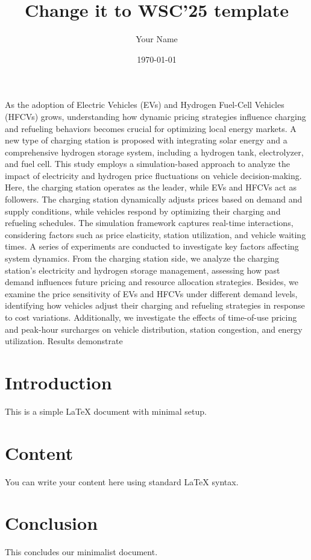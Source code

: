 \documentclass{article}
\begin{document}
\title{Change it to WSC'25 template}
\author{Your Name}
\date{\today}

\maketitle

As the adoption of Electric Vehicles (EVs) and Hydrogen Fuel-Cell Vehicles (HFCVs) grows, understanding how dynamic pricing strategies influence charging and refueling behaviors becomes crucial for optimizing local energy markets. A new type of charging station is proposed with integrating solar energy and a comprehensive hydrogen storage system, including a hydrogen tank, electrolyzer, and fuel cell. This study employs a simulation-based approach to analyze the impact of electricity and hydrogen price fluctuations on vehicle decision-making. Here, the charging station operates as the leader, while EVs and HFCVs act as followers. The charging station dynamically adjusts prices based on demand and supply conditions, while vehicles respond by optimizing their charging and refueling schedules. The simulation framework captures real-time interactions, considering factors such as price elasticity, station utilization, and vehicle waiting times. A series of experiments are conducted to investigate key factors affecting system dynamics. From the charging station side, we analyze the charging station’s electricity and hydrogen storage management, assessing how past demand influences future pricing and resource allocation strategies. Besides, we examine the price sensitivity of EVs and HFCVs under different demand levels, identifying how vehicles adjust their charging and refueling strategies in response to cost variations. Additionally, we investigate the effects of time-of-use pricing and peak-hour surcharges on vehicle distribution, station congestion, and energy utilization.
Results demonstrate 

\section{Introduction}
This is a simple LaTeX document with minimal setup.

\section{Content}
You can write your content here using standard LaTeX syntax.

\section{Conclusion}
This concludes our minimalist document.
\end{document}
